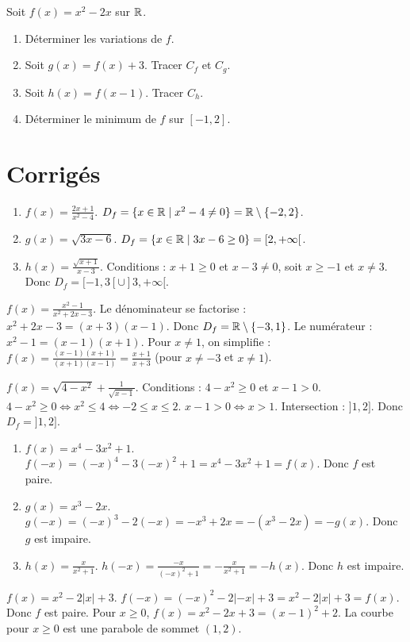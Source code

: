 Soit $f(x)=x^2-2x$ sur $\mathbb{R}$.
\begin{enumerate}[label=\arabic*)]
\item Déterminer les variations de $f$.
\item Soit $g(x)=f(x)+3$. Tracer $C_f$ et $C_g$.
\item Soit $h(x)=f(x-1)$. Tracer $C_h$.
\item Déterminer le minimum de $f$ sur $[-1,2]$.
\end{enumerate}

\section{Corrigés}

\begin{enumerate}[label=\alph*)]
\item $f(x)=\frac{2x+1}{x^2-4}$. $D_f=\{x\in\mathbb{R}\mid x^2-4\neq0\}=\mathbb{R}\setminus\{-2,2\}$.
\item $g(x)=\sqrt{3x-6}$. $D_f=\{x\in\mathbb{R}\mid 3x-6\ge0\}=[2,+\infty[$.
\item $h(x)=\frac{\sqrt{x+1}}{x-3}$. Conditions : $x+1\ge0$ et $x-3\neq0$, soit $x\ge-1$ et $x\neq3$. Donc $D_f=[-1,3[\cup]3,+\infty[$.
\end{enumerate}

$f(x)=\frac{x^2-1}{x^2+2x-3}$. Le dénominateur se factorise : $x^2+2x-3=(x+3)(x-1)$. Donc $D_f=\mathbb{R}\setminus\{-3,1\}$. Le numérateur : $x^2-1=(x-1)(x+1)$. Pour $x\neq1$, on simplifie : $f(x)=\frac{(x-1)(x+1)}{(x+1)(x-1)}=\frac{x+1}{x+3}$ (pour $x\neq-3$ et $x\neq1$).

$f(x)=\sqrt{4-x^2}+\frac{1}{\sqrt{x-1}}$. Conditions : $4-x^2\ge0$ et $x-1>0$. $4-x^2\ge0\iff x^2\le4\iff -2\le x\le2$. $x-1>0\iff x>1$. Intersection : $]1,2]$. Donc $D_f=]1,2]$.

\begin{enumerate}[label=\alph*)]
\item $f(x)=x^4-3x^2+1$. $f(-x)=(-x)^4-3(-x)^2+1=x^4-3x^2+1=f(x)$. Donc $f$ est paire.
\item $g(x)=x^3-2x$. $g(-x)=(-x)^3-2(-x)=-x^3+2x=-(x^3-2x)=-g(x)$. Donc $g$ est impaire.
\item $h(x)=\frac{x}{x^2+1}$. $h(-x)=\frac{-x}{(-x)^2+1}=-\frac{x}{x^2+1}=-h(x)$. Donc $h$ est impaire.
\end{enumerate}

$f(x)=x^2-2|x|+3$. $f(-x)=(-x)^2-2|-x|+3=x^2-2|x|+3=f(x)$. Donc $f$ est paire. Pour $x\ge0$, $f(x)=x^2-2x+3=(x-1)^2+2$. La courbe pour $x\ge0$ est une parabole de sommet $(1,2)$.

